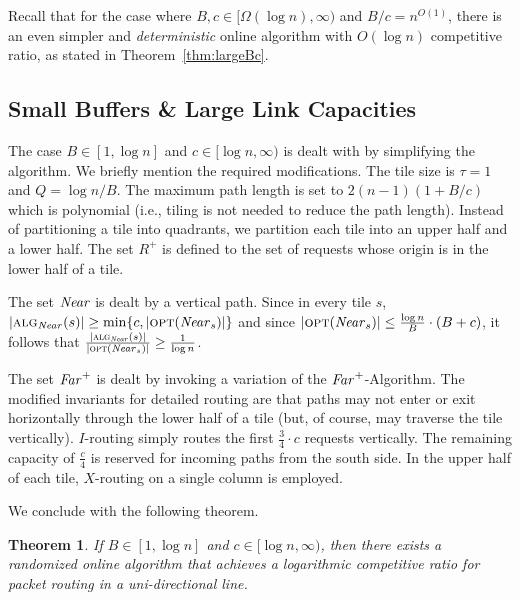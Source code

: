\documentclass[11pt]{article}
\newtheorem{theorem}{Theorem}
\newcommand{\opt}{\text{\textsc{opt}}}
\newcommand{\alg}{\text{\sc{alg}}}
\newenvironment{proof sketch}[1]{\noindent {\emph{Proof sketch of #1:}}}{\hfill \qed}
\newcommand{\far}{\text{\emph{Far}}}
\newcommand{\near}{\text{\emph{Near}}}
\newcommand{\algn}{\alg_{\near}}
\newcommand{\hl}{\tau}
\newcommand{\vl}{Q}
\begin{document}
Recall that for the case where $B,c \in [\Omega(\log
n),\infty)$ and $B/c = n^{O(1)}$, there is an even simpler
and \emph{deterministic} online algorithm with $O(\log n)$
competitive ratio, as stated in Theorem~\ref{thm:largeBc}.

\subsection{Small Buffers \& Large Link Capacities}\label{sec:smallBlargec}
The case $B\in [1,\log n]$ and $c \in [\log n, \infty)$ is dealt with
by simplifying the algorithm. We briefly mention the required
modifications. The tile size is $\hl=1$ and $\vl=\log n/B$.  The maximum
path length is set to $2(n-1)(1+B/c)$ which is polynomial (i.e.,
tiling is not needed to reduce the path length).  Instead of
partitioning a tile into quadrants, we partition each tile into an
upper half and a lower half. The set $R^+$ is defined to the set of
requests whose origin is in the lower half of a tile.

The set $\near$ is dealt by a vertical path. Since in every
tile $s$, $|\algn(s)| \geq \min \{c,|\opt(\near_s)|\}$ and
since $|\opt(\near_s)| \leq \frac {\log n }{B} \cdot (B +
c)$, it follows that $\frac{|\algn(s)|}{|\opt(\near_s)|}
\geq \frac {1}{\log n}$.

The set $\far^+$ is dealt by invoking a variation of the
$\far^+$-Algorithm. The modified invariants for detailed
routing are that paths may not enter or exit horizontally
through the lower half of a tile (but, of course, may
traverse the tile vertically).  $I$-routing simply routes
the first $\frac 34 \cdot c$ requests vertically. The
remaining capacity of $\frac c4$ is reserved for incoming
paths from the south side. In the upper half of each tile,
$X$-routing on a single column is employed.

We conclude with the following theorem.
\begin{theorem}
  If $B\in [1,\log n]$ and $c \in [\log n, \infty)$, then there exists a randomized
  online algorithm that achieves a logarithmic competitive ratio for packet routing
  in a uni-directional line.
\end{theorem}


\begin{comment}
\begin{verbatim}

b<logn and n^2 > c > log n

B > m^{O(1)} and c > \log n

for the case of \section{Large Buffers \& Large Link Capacities} the requirement on c is
not required.

Superpoly B...maybe using the poly(n) pipelining?
\end{verbatim}
\end{comment}
\end{document}
